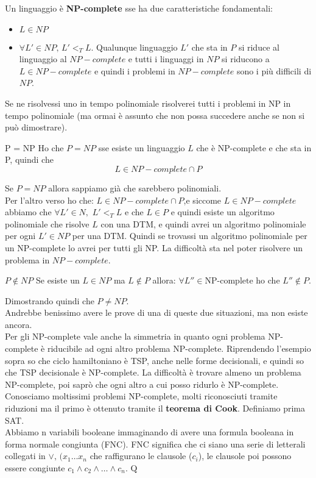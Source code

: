 Un linguaggio è \textbf{NP-complete} sse ha due caratteristiche fondamentali: 
\begin{itemize}
    \item $L\in NP$
    \item $\forall L'\in NP, \, L'<_T L$. Qualunque linguaggio $L'$ che sta in $P$ si riduce al linguaggio al $NP-complete$ e tutti i linguaggi in $NP$ si riducono a $L \in NP-complete$ e quindi i problemi in $NP-complete$ sono i più difficili di $NP$. 
\end{itemize}
Se ne risolvessi uno in tempo polinomiale risolverei tutti i problemi in NP in tempo polinomiale (ma ormai è assunto che non possa succedere anche se non si può dimostrare).

\begin{teorema}{P = NP}{}
  Ho che $P=NP$ sse esiste un linguaggio $L$ che è NP-complete e che sta in P, quindi che  $$L\in NP-complete\cap P$$
\end{teorema}

Se $P=NP$ allora sappiamo già che sarebbero polinomiali.\\ Per l'altro verso ho che: $L\in NP-complete\cap P$,e siccome $L\in NP-complete$ abbiamo che $\forall L'\in N, \,\,L'<_T L$ e che $L \in P$ e quindi esiste un algoritmo polinomiale che risolve $L$ con una DTM, e quindi avrei un algoritmo polinomiale per ogni $L'\in NP$ per una DTM. Quindi se trovassi un algoritmo polinomiale per un NP-complete lo avrei per tutti gli NP. La difficoltà sta nel poter risolvere un problema in $NP-complete$.

\begin{teorema}{$P \notin NP$}{}
  Se esiste un $L\in NP$ ma $L\notin P$ allora: $\forall L''\in \mbox{NP-complete}$ ho che $L''\notin P$.
\end{teorema}

Dimostrando quindi che $P \neq NP$.\\ Andrebbe benissimo avere le prove di una di queste due situazioni, ma non esiste ancora.\\ 
Per gli NP-complete vale anche la simmetria in quanto ogni problema NP-complete è riducibile ad ogni altro problema NP-complete. Riprendendo l'esempio sopra so che ciclo hamiltoniano è TSP, anche nelle forme decisionali, e quindi so che TSP decisionale è NP-complete. La difficoltà è trovare almeno un problema NP-complete, poi saprò che ogni altro a cui posso ridurlo è NP-complete.\\ 
Conosciamo moltissimi problemi NP-complete, molti riconosciuti tramite riduzioni ma il primo è ottenuto tramite il \textbf{teorema di Cook}. Definiamo prima SAT.\\
Abbiamo n variabili booleane immaginando di avere una formula booleana in forma normale congiunta (FNC). FNC significa che ci siano una serie di letterali collegati in $\lor, \,(x_1 \dots x_n$ che raffigurano le clausole ($c_i$), le clausole poi possono essere congiunte $c_1 \land c_2 \land \dots \land c_n$. Q

